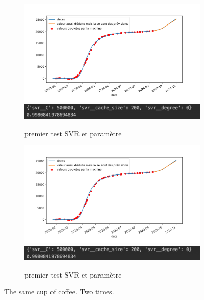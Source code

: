 \documentclass[a4paper,11pt]{article}
\begin{document}
\begin{figure}[h!]
  \centering
  \begin{subfigure}[b]{0.5\linewidth}
    \includegraphics[width=\linewidth]{deces_covid_machinelearning1.png}
   \includegraphics[width=\linewidth]{params1.png}
    \caption{premier test SVR et paramètre }
     \end{subfigure}
  \begin{subfigure}[b]{0.5\linewidth}
    \includegraphics[width=\linewidth]{deces_covid_machinelearning1.png}
   \includegraphics[width=\linewidth]{params1.png}
    \caption{premier test SVR et paramètre }
  \end{subfigure}
  \caption{The same cup of coffee. Two times.}
  \label{fig:coffee}
\end{figure}








	
\end{document}
